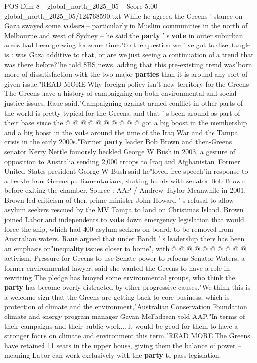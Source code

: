 \begin{textsample}{POS Dim 8 – global\_north\_2025\_05 – Score 5.00 – global\_north\_2025\_05/124768590.txt}
While he agreed the Greens ' stance on Gaza swayed some \textbf{voters} -- particularly in Muslim communities in the north of Melbourne and west of Sydney -- he said the \textbf{party} ' s \textbf{vote} in outer suburban areas had been growing for some time."So the question we ' ve got to disentangle is : was Gaza additive to that, or are we just seeing a continuation of a trend that was there before?"he told SBS news, adding that this pre-existing trend was"born more of dissatisfaction with the two major \textbf{parties} than it is around any sort of given issue."READ MORE Why foreign policy isn't new territory for the Greens The Greens have a history of campaigning on both environmental and social justice issues, Raue said."Campaigning against armed conflict in other parts of the world is pretty typical for the Greens, and that ' s been around as part of their base since the @ @ @ @ @ @ @ @ @ @ got a big boost in the membership and a big boost in the \textbf{vote} around the time of the Iraq War and the Tampa crisis in the early 2000s."Former \textbf{party} leader Bob Brown and then-Greens senator Kerry Nettle famously heckled George W Bush in 2003, a gesture of opposition to Australia sending 2,000 troops to Iraq and Afghanistan.
Former United States president George W Bush said he"loved free speech"in response to a heckle from Greens parliamentarians, shaking hands with senator Bob Brown before exiting the chamber.
Source : AAP / Andrew Taylor Meanwhile in 2001, Brown led criticism of then-prime minister John Howard ' s refusal to allow asylum seekers rescued by the MV Tampa to land on Christmas Island.
Brown joined Labor and independents to \textbf{vote} down emergency legislation that would force the ship, which had 400 asylum seekers on board, to be removed from Australian waters.
Raue argued that under Bandt ' s leadership there has been an emphasis on"inequality issues closer to home", with @ @ @ @ @ @ @ @ @ @ activism.
Pressure for Greens to use Senate power to refocus Senator Waters, a former environmental lawyer, said she wanted the Greens to have a role in rewriting The pledge has buoyed some environmental groups, who think the \textbf{party} has become overly distracted by other progressive causes."We think this is a welcome sign that the Greens are getting back to core business, which is protection of climate and the environment,"Australian Conservation Foundation climate and energy program manager Gavan McFadzean told AAP."In terms of their campaigns and their public work... it would be good for them to have a stronger focus on climate and environment this term."READ MORE The Greens have retained 11 seats in the upper house, giving them the balance of power -- meaning Labor can work exclusively with the \textbf{party} to pass legislation.

\end{textsample}
